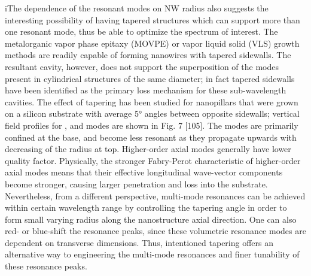 iThe dependence of the resonant modes on NW radius also suggests the interesting possibility of having tapered structures which can support more than one resonant mode, thus be able to optimize the spectrum of interest.  The metalorganic vapor phase epitaxy (MOVPE) or vapor liquid solid (VLS) growth methods are readily capable of forming nanowires with tapered sidewalls. The resultant cavity, however, does not support the superposition of the modes present in cylindrical structures of the same diameter; in fact tapered sidewalls have been identified as the primary loss mechanism for these sub-wavelength cavities.  The effect of  tapering has been studied for  nanopillars that were grown on a silicon substrate with average 5° angles between opposite sidewalls; vertical field profiles for ,  and  modes are shown in Fig. 7 [105]. The modes are primarily confined at the base, and become less resonant as they propagate upwards with decreasing of the radius at top. Higher-order axial modes generally have lower quality factor. Physically, the stronger Fabry-Perot characteristic of higher-order axial modes means that their effective longitudinal wave-vector components become stronger, causing larger penetration and loss into the substrate. Nevertheless, from a different perspective, multi-mode resonances can be achieved within certain wavelength range by controlling the tapering angle in order to form small varying radius along the nanostructure axial direction. One can also red- or blue-shift the resonance peaks, since these volumetric resonance modes are dependent on transverse dimensions. Thus, intentioned tapering offers an alternative way to engineering the multi-mode resonances and finer tunability of these resonance peaks.




